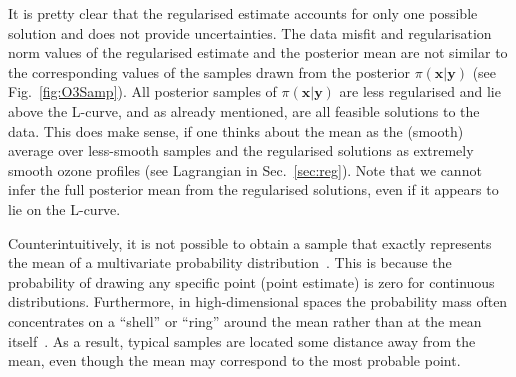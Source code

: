 It is pretty clear that the regularised estimate accounts for only one possible solution and does not provide uncertainties. 
The data misfit and regularisation norm values of the regularised estimate and the posterior mean are not similar to the corresponding values of the samples drawn from the posterior $\pi(\bm{x}| \bm{y})$ (see Fig.~\ref{fig:O3Samp}).
All posterior samples of $\pi(\bm{x}| \bm{y})$ are less regularised and lie above the L-curve, and as already mentioned, are all feasible solutions to the data.
This does make sense, if one thinks about the mean as the (smooth) average over less-smooth samples and the regularised solutions as extremely smooth ozone profiles (see Lagrangian in Sec.~\ref{sec:reg}).
Note that we cannot infer the full posterior mean from the regularised solutions, even if it appears to lie on the L-curve.

Counterintuitively, it is not possible to obtain a sample that exactly represents the mean of a multivariate probability distribution~\cite[Sec.~3.1]{VershyninMultiD2018}. 
This is because the probability of drawing any specific point (point estimate) is zero for continuous distributions.
Furthermore, in high-dimensional spaces the probability mass often concentrates on a “shell” or “ring” around the mean rather than at the mean itself~\cite{VowelsMultiD}. As a result, typical samples are located some distance away from the mean, even though the mean may correspond to the most probable point.




